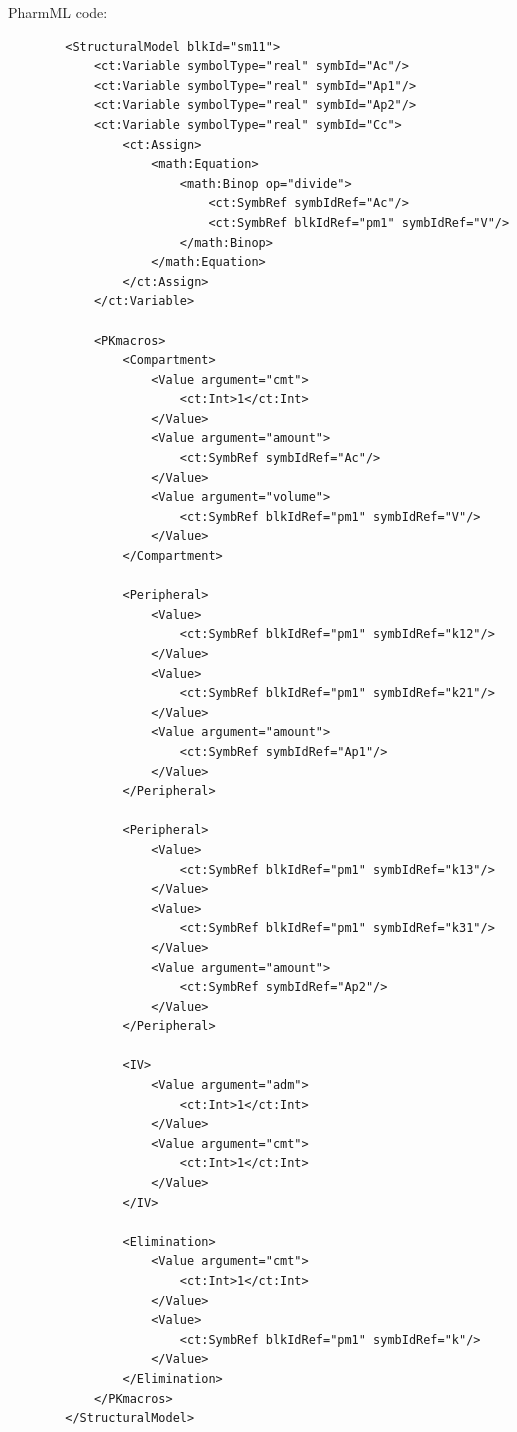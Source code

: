 PharmML code:
\lstset{language=XML}
\begin{lstlisting}
        <StructuralModel blkId="sm11">
            <ct:Variable symbolType="real" symbId="Ac"/>
            <ct:Variable symbolType="real" symbId="Ap1"/>
            <ct:Variable symbolType="real" symbId="Ap2"/>
            <ct:Variable symbolType="real" symbId="Cc">
                <ct:Assign>
                    <math:Equation>
                        <math:Binop op="divide">
                            <ct:SymbRef symbIdRef="Ac"/>
                            <ct:SymbRef blkIdRef="pm1" symbIdRef="V"/>
                        </math:Binop>
                    </math:Equation>
                </ct:Assign>
            </ct:Variable>
            
            <PKmacros>
                <Compartment>
                    <Value argument="cmt">
                        <ct:Int>1</ct:Int>
                    </Value>
                    <Value argument="amount">
                        <ct:SymbRef symbIdRef="Ac"/>
                    </Value>
                    <Value argument="volume">
                        <ct:SymbRef blkIdRef="pm1" symbIdRef="V"/>
                    </Value>
                </Compartment>
                
                <Peripheral>
                    <Value>
                        <ct:SymbRef blkIdRef="pm1" symbIdRef="k12"/>
                    </Value>
                    <Value>
                        <ct:SymbRef blkIdRef="pm1" symbIdRef="k21"/>
                    </Value>
                    <Value argument="amount">
                        <ct:SymbRef symbIdRef="Ap1"/>
                    </Value>
                </Peripheral>
                
                <Peripheral>
                    <Value>
                        <ct:SymbRef blkIdRef="pm1" symbIdRef="k13"/>
                    </Value>
                    <Value>
                        <ct:SymbRef blkIdRef="pm1" symbIdRef="k31"/>
                    </Value>
                    <Value argument="amount">
                        <ct:SymbRef symbIdRef="Ap2"/>
                    </Value>
                </Peripheral>
                
                <IV>
                    <Value argument="adm">
                        <ct:Int>1</ct:Int>
                    </Value>
                    <Value argument="cmt">
                        <ct:Int>1</ct:Int>
                    </Value>
                </IV>
                
                <Elimination>
                    <Value argument="cmt">
                        <ct:Int>1</ct:Int>
                    </Value>
                    <Value>
                        <ct:SymbRef blkIdRef="pm1" symbIdRef="k"/>
                    </Value>
                </Elimination>
            </PKmacros>
        </StructuralModel>
\end{lstlisting}


